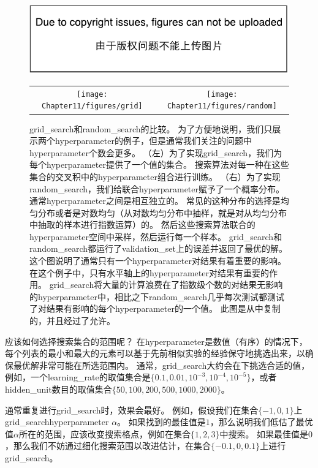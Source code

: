 \begin{figure}[!htb]
\ifOpenSource
\centerline{\includegraphics{figure.pdf}}
\else
\begin{tabular}{cc}
\texttt{[image: Chapter11/figures/grid]} &
\texttt{[image: Chapter11/figures/random]}
\end{tabular}
\fi
\caption{\gls{grid_search}和\gls{random_search}的比较。
为了方便地说明，我们只展示两个\gls{hyperparameter}的例子，但是通常我们关注的问题中\gls{hyperparameter}个数会更多。
（左）为了实现\gls{grid_search}，我们为每个\gls{hyperparameter}提供了一个值的集合。
搜索算法对每一种在这些集合的交叉积中的\gls{hyperparameter}组合进行训练。
（右）为了实现\gls{random_search}，我们给联合\gls{hyperparameter}赋予了一个概率分布。
通常\gls{hyperparameter}之间是相互独立的。
常见的这种分布的选择是均匀分布或者是对数均匀（从对数均匀分布中抽样，就是对从均匀分布中抽取的样本进行指数运算）的。
然后这些搜索算法联合的\gls{hyperparameter}空间中采样，然后运行每一个样本。
\gls{grid_search}和\gls{random_search}都运行了\gls{validation_set}上的误差并返回了最优的解。
这个图说明了通常只有一个\gls{hyperparameter}对结果有着重要的影响。
在这个例子中，只有水平轴上的\gls{hyperparameter}对结果有重要的作用。
\gls{grid_search}将大量的计算浪费在了指数级个数的对结果无影响的\gls{hyperparameter}中，相比之下\gls{random_search}几乎每次测试都测试了对结果有影响的每个\gls{hyperparameter}的一个值。
此图是从\citet{Bergstra+Bengio-LW2011}中复制的，并且经过了允许。}
\label{fig:chap11_grid_vs_random}
\end{figure}


应该如何选择搜索集合的范围呢？
在\gls{hyperparameter}是数值（有序）的情况下，每个列表的最小和最大的元素可以基于先前相似实验的经验保守地挑选出来，以确保最优解非常可能在所选范围内。
通常，\gls{grid_search}大约会在下挑选合适的值，例如，一个\gls{learning_rate}的取值集合是$\{0.1,0.01,10^{-3},10^{-4},10^{-5}\}$，或者\gls{hidden_unit}数目的取值集合$\{50,100,200,500,1000,2000\}$。


通常重复进行\gls{grid_search}时，效果会最好。
例如，假设我们在集合$\{-1,0,1\}$上\gls{grid_search}\gls{hyperparameter} $\alpha$。
如果找到的最佳值是$1$，那么说明我们低估了最优值$\alpha$所在的范围，应该改变搜索格点，例如在集合$\{1,2,3\}$中搜索。
如果最佳值是$0$，那么我们不妨通过细化搜索范围以改进估计，在集合$\{-0.1,0,0.1\}$上进行\gls{grid_search}。


